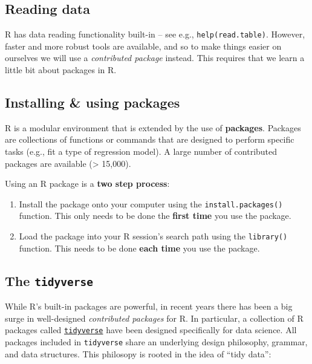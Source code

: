 \documentclass[]{book}
\begin{document}
\subsection{Reading data}\label{reading-data}

R has data reading functionality built-in -- see e.g.,
\texttt{help(read.table)}. However, faster and more robust tools are
available, and so to make things easier on ourselves we will use a
\emph{contributed package} instead. This requires that we learn a little
bit about packages in R.

\subsection{Installing \& using
packages}\label{installing-using-packages}

R is a modular environment that is extended by the use of
\textbf{packages}. Packages are collections of functions or commands
that are designed to perform specific tasks (e.g., fit a type of
regression model). A large number of contributed packages are available
(\textgreater{} 15,000).

Using an R package is a \textbf{two step process}:

\begin{enumerate}
\def\labelenumi{\arabic{enumi}.}
\item
  Install the package onto your computer using the
  \texttt{install.packages()} function. This only needs to be done the
  \textbf{first time} you use the package.
\item
  Load the package into your R session's search path using the
  \texttt{library()} function. This needs to be done \textbf{each time}
  you use the package.
\end{enumerate}

\subsection{\texorpdfstring{The
\texttt{tidyverse}}{The tidyverse}}\label{the-tidyverse}

While R's built-in packages are powerful, in recent years there has been
a big surge in well-designed \emph{contributed packages} for R. In
particular, a collection of R packages called
\href{https://www.tidyverse.org/}{\texttt{tidyverse}} have been designed
specifically for data science. All packages included in
\texttt{tidyverse} share an underlying design philosophy, grammar, and
data structures. This philosopy is rooted in the idea of ``tidy data'':
\end{document}
